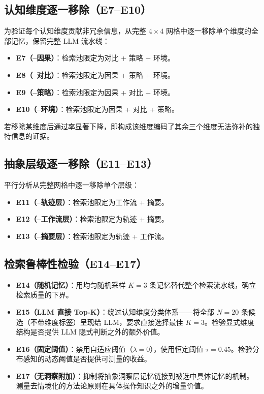 \documentclass[UTF8,twocolumn]{ctexart}
\begin{document}
\subsection{认知维度逐一移除（E7--E10）}

为验证每个认知维度贡献非冗余信息，从完整 $4 \times 4$ 网格中逐一移除单个维度的全部记忆，保留完整 LLM 流水线：

\begin{itemize}
    \item \textbf{E7（--因果）}：检索池限定为对比 + 策略 + 环境。
    \item \textbf{E8（--对比）}：检索池限定为因果 + 策略 + 环境。
    \item \textbf{E9（--策略）}：检索池限定为因果 + 对比 + 环境。
    \item \textbf{E10（--环境）}：检索池限定为因果 + 对比 + 策略。
\end{itemize}

若移除某维度后通过率显著下降，即构成该维度编码了其余三个维度无法弥补的独特信息的证据。

\subsection{抽象层级逐一移除（E11--E13）}

平行分析从完整网格中逐一移除单个层级：

\begin{itemize}
    \item \textbf{E11（--轨迹层）}：检索池限定为工作流 + 摘要。
    \item \textbf{E12（--工作流层）}：检索池限定为轨迹 + 摘要。
    \item \textbf{E13（--摘要层）}：检索池限定为轨迹 + 工作流。
\end{itemize}

\subsection{检索鲁棒性检验（E14--E17）}

\begin{itemize}
    \item \textbf{E14（随机记忆）}：用均匀随机采样 $K=3$ 条记忆替代整个检索流水线，确立检索质量的下界。
    \item \textbf{E15（LLM 直接 Top-K）}：绕过认知维度分类体系——将全部 $N=20$ 条候选（不带维度标签）呈现给 LLM，要求直接选择最佳 $K=3$。检验显式维度结构是否提供 LLM 隐式判断之外的额外价值。
    \item \textbf{E16（固定阈值）}：禁用自适应阈值（$\lambda = 0$），使用恒定阈值 $\tau = 0.45$。检验分布感知的动态阈值是否提供可测量的收益。
    \item \textbf{E17（无洞察附加）}：抑制将抽象洞察层记忆链接到被选中具体记忆的机制。测量去情境化的方法论原则在具体操作知识之外的增量价值。
\end{itemize}
\end{document}
